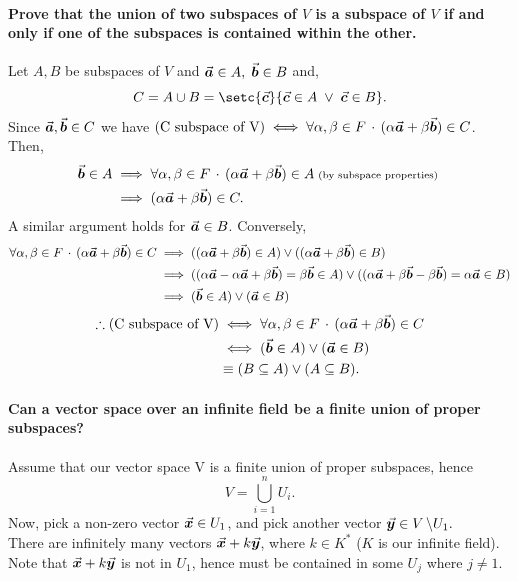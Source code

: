 \documentclass[MathsNotesBase.tex]{subfiles}
\begin{document}
	\paragraph{\small{Prove that the union of two subspaces of $V$ is a subspace of $V$ if and only if one of the subspaces is contained within the other.}}
		Let $A, B$ be subspaces of $V$ and $\vec{\bm{a}} \in A,\; \vec{\bm{b}} \in B$ and, 
			\[ C = A \cup B = \setc{\V{c}}{\V{c} \in A \;\vee\; \V{c} \in B}. \]
		Since $\vec{\bm{a}},\vec{\bm{b}} \in C$ we have $\text{(C subspace of V)} \iff \forall\alpha,\beta \in F \,\cdot\, (\alpha\vec{\bm{a}} + \beta\vec{\bm{b}}) \in C$. Then,
		\begin{align*}
		\vec{\bm{b}} \in A &\implies \forall\alpha,\beta \in F \,\cdot\, (\alpha\vec{\bm{a}} + \beta\vec{\bm{b}}) \in A \text{\scriptsize{ (by subspace properties) }}\\
		&\implies (\alpha\vec{\bm{a}} + \beta\vec{\bm{b}}) \in C.
		\end{align*}
		A similar argument holds for $\vec{\bm{a}} \in B$. Conversely,
		\begin{align*}
		\forall\alpha,\beta \in F \,\cdot\, (\alpha\vec{\bm{a}} + \beta\vec{\bm{b}}) \in C &\implies ((\alpha\vec{\bm{a}} + \beta\vec{\bm{b}}) \in A) \vee ((\alpha\vec{\bm{a}} + \beta\vec{\bm{b}}) \in B)\\
		&\implies ((\alpha\vec{\bm{a}} - \alpha\vec{\bm{a}} + \beta\vec{\bm{b}}) = \beta\vec{\bm{b}} \in A) \vee ((\alpha\vec{\bm{a}} + \beta\vec{\bm{b}} - \beta\vec{\bm{b}}) = \alpha\vec{\bm{a}} \in B)\\
		&\implies (\vec{\bm{b}} \in A) \vee (\vec{\bm{a}} \in B)
		\end{align*}
		\begin{align*}
		\therefore \text{(C subspace of V)} &\iff \forall\alpha,\beta \in F \,\cdot\, (\alpha\vec{\bm{a}} + \beta\vec{\bm{b}}) \in C\\
		&\iff (\vec{\bm{b}} \in A) \vee (\vec{\bm{a}} \in B)\\
		&\equiv (B \subseteq A) \vee (A \subseteq B).
		\end{align*}
	
	
	\paragraph{\small{Can a vector space over an infinite field be a finite union of proper subspaces?}}
		Assume that our vector space V is a finite union of proper subspaces, hence
		\[ V=\bigcup_{i=1}^n U_i. \]
		Now, pick a non-zero vector $ \vec{\bm{x}} \in U_1 $, and pick another vector $ \vec{\bm{y}} \in V\,\backslash U_1. $\\
		
		There are infinitely many vectors $ \vec{\bm{x}} + k\vec{\bm{y}} $, where $ k\in K^* $ ($ K $ is our infinite field). Note that $ \vec{\bm{x}} + k\vec{\bm{y}} $ is not in $ U_1 $, hence must be contained in some $ U_j $ where $ j\neq 1 $.\\
		
\end{document}
